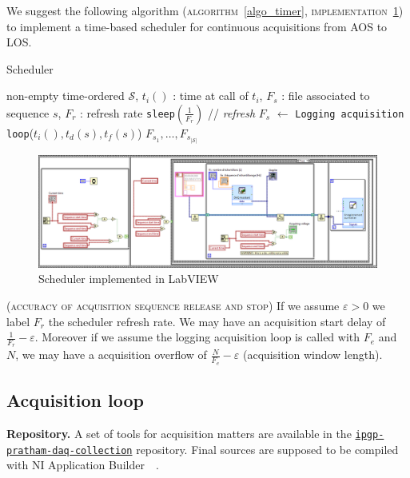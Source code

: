 \documentclass[twocolumn,pre,floats,aps,amsmath,amssymb]{revtex4}
\newenvironment{remark}[1][Remarque.]{\begin{trivlist}
\item[\hskip \labelsep {\bfseries #1}]}{\end{trivlist}}
\begin{document}
We suggest the following algorithm (\textsc{algorithm}~\ref{algo_timer}, \textsc{implementation~\ref{fig:algo_timer_labview}}) to implement a time-based scheduler for continuous acquisitions from AOS to LOS.

\begin{algorithm}[h]
\caption{Scheduler}
\label{algo_timer}
\begin{algorithmic}[1]
  \REQUIRE non-empty time-ordered $\mathcal{S}$, $t_i()$ : time at call of $t_i$, $F_s$ : file associated to sequence $s$, $F_r$ : refresh rate
  \STATE \texttt{sleep}$(\frac{1}{F_r})$ \hfill // \textit{refresh}
  \ENDWHILE
  \STATE $F_s$ $\leftarrow$ \texttt{Logging acquisition loop}($t_i (), t_d (s), t_f (s)$)
  \ENDFOR
  \RETURN $F_{s_1}, \dots, F_{s_{\left | \mathcal{S} \right |}}$
\end{algorithmic}
\end{algorithm}

\begin{figure}[]
  \includegraphics[width=17.5cm]{pictures/minuterie.png}
\caption{Scheduler implemented in LabVIEW}
\label{fig:algo_timer_labview}
\end{figure}

\begin{remark}
  \textsc{(accuracy of acquisition sequence release and stop)}
  If we assume $\varepsilon > 0$ we label $F_r$ the scheduler refresh rate. We may have an acquisition start delay of $\frac{1}{F_r} - \varepsilon$. Moreover if we assume the logging acquisition loop is called with $F_e$ and $N$, we may have a acquisition overflow of $\frac{N}{F_e} - \varepsilon$ (acquisition window length).
\end{remark}

\subsection{Acquisition loop}

\noindent
\textbf{Repository.} A set of tools for acquisition matters are available in the \href{https://github.com/EmptyStackExn/ipgp-pratham-daq-collection}{\texttt{ipgp-pratham-daq-collection}} repository. Final sources are supposed to be compiled with NI Application Builder~\cite{NI_compiler}~\cite{NI_application_builder}.
\end{document}
